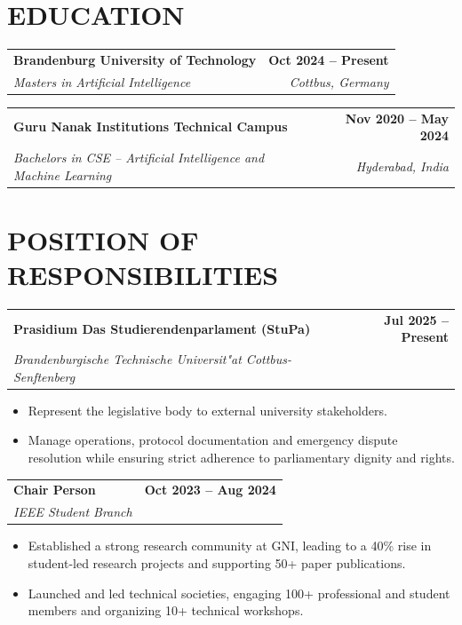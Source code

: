 \documentclass[a4paper,11pt]{article}
\makeatletter
\newcommand{\entryheader}[4]{%
  \begin{tabularx}{\textwidth}{@{}>{\RaggedRight\arraybackslash}X r@{}}
    \textbf{#1} & \textbf{#2} \\
    \textit{#3} & \textit{#4} \\
  \end{tabularx}%
}
\newenvironment{entrybullets}{%
  \begin{minipage}[t]{0.77\textwidth}
    \begin{itemize}[leftmargin=*,label=\textbullet,align=left]
}{%
    \end{itemize}
  \end{minipage}
}
\makeatother
\begin{document}
\section*{EDUCATION}
\begin{tabularx}{\textwidth}{@{}X r@{}}
  \textbf{Brandenburg University of Technology} & \textbf{Oct 2024 -- Present} \\
  \textit{Masters in Artificial Intelligence} & \textit{Cottbus, Germany} \\
\end{tabularx}

\vspace{0.25cm}
\begin{tabularx}{\textwidth}{@{}X r@{}}
  \textbf{Guru Nanak Institutions Technical Campus} & \textbf{Nov 2020 -- May 2024} \\
  \textit{Bachelors in CSE -- Artificial Intelligence and Machine Learning} & \textit{Hyderabad, India} \\
\end{tabularx}

\section*{POSITION OF RESPONSIBILITIES}
\entryheader{Prasidium Das Studierendenparlament (StuPa)}{Jul 2025 -- Present}{Brandenburgische Technische Universit"at Cottbus-Senftenberg}{}
\begin{entrybullets}
  \item Represent the legislative body to external university stakeholders.
  \item Manage operations, protocol documentation and emergency dispute resolution while ensuring strict adherence to parliamentary dignity and rights.
\end{entrybullets}

\vspace{0.25cm}
\entryheader{Chair Person}{Oct 2023 -- Aug 2024}{IEEE Student Branch}{}
\begin{entrybullets}
  \item Established a strong research community at GNI, leading to a 40\% rise in student-led research projects and supporting 50+ paper publications.
  \item Launched and led technical societies, engaging 100+ professional and student members and organizing 10+ technical workshops.
\end{entrybullets}
\end{document}
